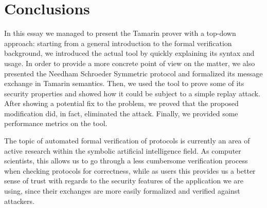 \documentclass[fleqn,10pt]{SelfArx} %
\begin{document}
\section{Conclusions}\label{sec:conclusions}

In this essay we managed to present the Tamarin prover with a top-down approach: starting from a general introduction to the formal verification background, we introduced the actual tool by quickly explaining its syntax and usage. In order to provide a more concrete point of view on the matter, we also presented the Needham Schroeder Symmetric protocol and formalized its message exchange in Tamarin semantics. Then, we used the tool to prove some of its security properties and showed how it could be subject to a simple replay attack. After showing a potential fix to the problem, we proved that the proposed modification did, in fact, eliminated the attack. Finally, we provided some performance metrics on the tool.

The topic of automated formal verification of protocols is currently an area of active research within the symbolic artificial intelligence field. As computer scientists, this allows us to go through a less cumbersome verification process when checking protocols for correctness, while as users this provides us a better sense of trust with regards to the security features of the application we are using, since their exchanges are more easily formalized and verified against attackers.


% 
% 





\end{document}
